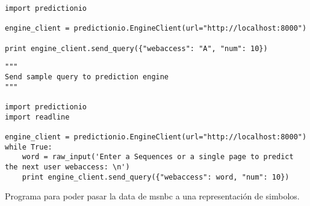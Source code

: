 \begin{lstlisting}[frame=single,basicstyle=\ttfamily\tiny,]
import predictionio

engine_client = predictionio.EngineClient(url="http://localhost:8000")

print engine_client.send_query({"webaccess": "A", "num": 10})
\end{lstlisting}



\begin{lstlisting}[frame=single,basicstyle=\ttfamily\tiny,]
"""
Send sample query to prediction engine
"""

import predictionio
import readline

engine_client = predictionio.EngineClient(url="http://localhost:8000")
while True:
    word = raw_input('Enter a Sequences or a single page to predict the next user webaccess: \n')
    print engine_client.send_query({"webaccess": word, "num": 10})

\end{lstlisting}






Programa para poder pasar la data de msnbc a una representación de simbolos.

